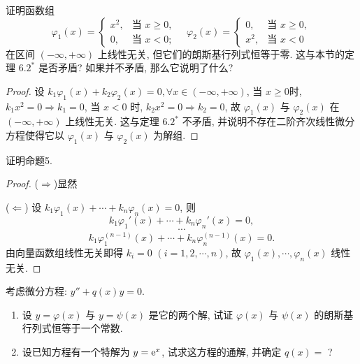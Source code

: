 \begin{exercise}
  证明函数组
  \[\varphi_1(x) =
    \begin{cases}
      x^2, & \text{当\ } x\geq 0, \\
      0,   & \text{当\ } x<0;
    \end{cases}\quad
    \varphi_2(x)=
    \begin{cases}
      0,   & \text{当\ } x\geq 0, \\
      x^2, & \text{当\ } x<0
    \end{cases}\]
  在区间 $(-\infty,+\infty)$ 上线性无关, 但它们的朗斯基行列式恒等于零. 
  这与本节的定理 $6.2^*$ 是否矛盾? 如果并不矛盾, 那么它说明了什么?
\end{exercise}

\begin{proof} 
  设 $k_1\varphi_1(x)+k_2\varphi_2(x)=0, \forall x\in (-\infty,+\infty)$,
  当 $x\geq 0$时, $k_1x^2=0\Rightarrow k_1=0$, 
  当 $x<0$ 时, $k_2x^2=0\Rightarrow k_2=0$, 
  故 $\varphi_1(x)$ 与 $\varphi_2(x)$ 在 $(-\infty,+\infty)$ 上线性无关. 
  这与定理 $6.2^*$ 不矛盾, 并说明不存在二阶齐次线性微分方程使得它以 $\varphi_1(x)$ 与 $\varphi_2(x)$ 为解组.
\end{proof}



\begin{exercise}
  证明命题5.
\end{exercise}

\begin{proof} 
  ($\Rightarrow$)显然

  ($\Leftarrow$) 设 $k_1\varphi_1(x)+\cdots+k_n\varphi_n(x)=0$, 则
  \[k_1\varphi_1'(x)+\cdots+k_n\varphi_n'(x)=0,\]
  \[\cdots\]
  \[k_1\varphi_1^{(n-1)}(x)+\cdots+k_n\varphi_n^{(n-1)}(x)=0.\]
  由向量函数组线性无关即得 $k_i=0$ $(i=1,2,\cdots,n)$, 故 $\varphi_1(x),\cdots,\varphi_n(x)$ 线性无关.
\end{proof}



\begin{exercise}
  考虑微分方程: $y''+q(x)y=0$.
  \begin{enumerate}[(1)]
  \item 设 $y=\varphi(x)$ 与 $y=\psi(x)$ 是它的两个解, 
    试证 $\varphi(x)$ 与 $\psi(x)$ 的朗斯基行列式恒等于一个常数.
  \item 设已知方程有一个特解为 $y=\mathrm{e}^x$, 试求这方程的通解, 并确定 $q(x)=$ ?
  \end{enumerate}
\end{exercise}

